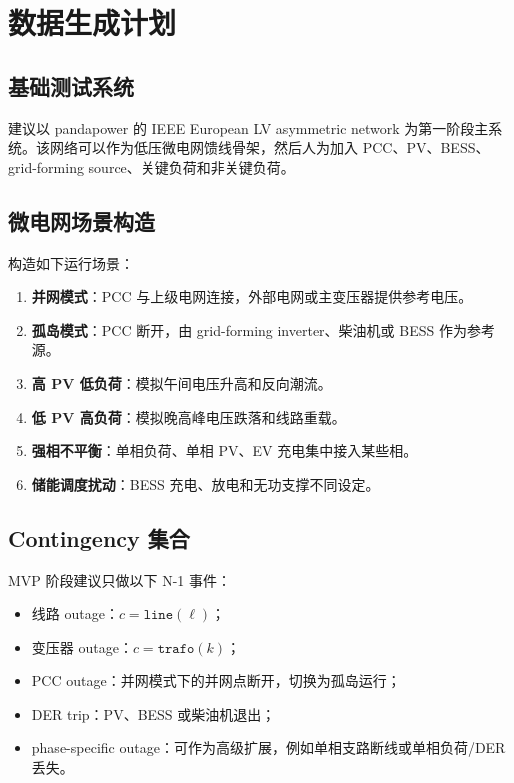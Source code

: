\documentclass[UTF8,11pt]{ctexart}
\begin{document}
\section{数据生成计划}

\subsection{基础测试系统}

建议以 pandapower 的 IEEE European LV asymmetric network 为第一阶段主系统。该网络可以作为低压微电网馈线骨架，然后人为加入 PCC、PV、BESS、grid-forming source、关键负荷和非关键负荷。

\subsection{微电网场景构造}

构造如下运行场景：

\begin{enumerate}
    \item \textbf{并网模式}：PCC 与上级电网连接，外部电网或主变压器提供参考电压。
    \item \textbf{孤岛模式}：PCC 断开，由 grid-forming inverter、柴油机或 BESS 作为参考源。
    \item \textbf{高 PV 低负荷}：模拟午间电压升高和反向潮流。
    \item \textbf{低 PV 高负荷}：模拟晚高峰电压跌落和线路重载。
    \item \textbf{强相不平衡}：单相负荷、单相 PV、EV 充电集中接入某些相。
    \item \textbf{储能调度扰动}：BESS 充电、放电和无功支撑不同设定。
\end{enumerate}

\subsection{Contingency 集合}

MVP 阶段建议只做以下 N-1 事件：

\begin{itemize}
    \item 线路 outage：$c = \texttt{line}(\ell)$；
    \item 变压器 outage：$c = \texttt{trafo}(k)$；
    \item PCC outage：并网模式下的并网点断开，切换为孤岛运行；
    \item DER trip：PV、BESS 或柴油机退出；
    \item phase-specific outage：可作为高级扩展，例如单相支路断线或单相负荷/DER 丢失。
\end{itemize}
\end{document}
